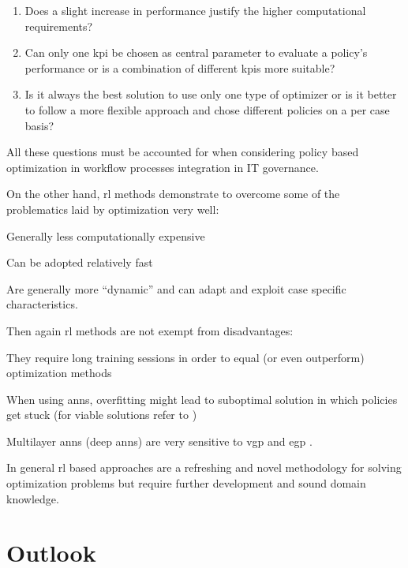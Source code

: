 \documentclass[draft=false]{seal_thesis}
\begin{document}
\begin{enumerate}[label=\textbf{Q. \arabic*}]
	\item Does a slight increase in performance justify the higher computational requirements?
	\item Can only one \gls{kpi} be chosen as central parameter to evaluate a policy's performance or is a combination of different \glspl{kpi} more suitable?
	\item Is it always the best solution to use only one type of optimizer or is it better to follow a more flexible approach and chose different policies on a per case basis?
\end{enumerate}

All these questions must be accounted for when considering policy based optimization in workflow processes integration in IT governance.

On the other hand, \gls{rl} methods demonstrate to overcome some of the problematics laid by optimization very well:
\begin{enumerate*}
	\item Generally less computationally expensive
	\item Can be adopted relatively fast
	\item Are generally more ``dynamic'' and can adapt and exploit case specific characteristics.
\end{enumerate*}

Then again \gls{rl} methods are not exempt from disadvantages:
\begin{enumerate*}
	\item They require long training sessions in order to equal (or even outperform) optimization methods
	\item When using \glspl{ann}, overfitting might lead to suboptimal solution in which policies get stuck (for viable solutions refer to \citet{Srivastava2014})
	\item Multilayer \glspl{ann} (\ie deep \glspl{ann}) are very sensitive to \gls{vgp} and \gls{egp} \citep{Bengio1994,Pascanu2012}.
\end{enumerate*}

In general \gls{rl} based approaches are a refreshing and novel methodology for solving optimization problems but require further development and sound domain knowledge.

\section{Outlook}
\end{document}
